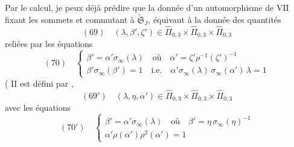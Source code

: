 \documentclass[11pt,a4paper]{article}
\begin{document}
Par le calcul, je peux déjà prédire que la donnée d'un automorphisme de $\mathrm{VII}$ fixant les sommets et commutant à $\widetilde{\mathfrak{S}}_J$, équivaut à la donnée des quantités
\[
(69)\quad (\lambda, \beta', \zeta') \in \widehat{\Pi}_{0,3} \times \widehat{\Pi}_{0,3} \times \widehat{\Pi}_{0,3}
\]
reliées par les équations 
\[
(70)\quad
\begin{cases}
\beta' = \alpha' \sigma_\infty(\lambda) \quad \text{où} \quad \alpha' = \zeta' \rho^{-1}(\zeta')^{-1} \\
\beta' \sigma_\infty(\beta') = 1 \quad \text{i.e.} \quad \alpha' \sigma_\infty(\lambda)\, \sigma_\infty(\alpha')\, \lambda = 1
\end{cases}
\]
(  $\mathrm{II}$  est défini par ,
\[
(69')\quad (\lambda, \eta, \alpha') \in \widehat{\Pi}_{0,3} \times \widehat{\Pi}_{0,3} \times \widehat{\Pi}_{0,3}
\]
 avec les équations
\[
(70')\quad
\begin{cases}
\beta' = \alpha' \sigma_\infty(\lambda) \quad \text{où} \quad \beta' = \eta\, \sigma_\infty(\eta)^{-1} \\
\alpha' \rho(\alpha') \rho^{2}(\alpha') = 1
\end{cases}
\]
\end{document}
